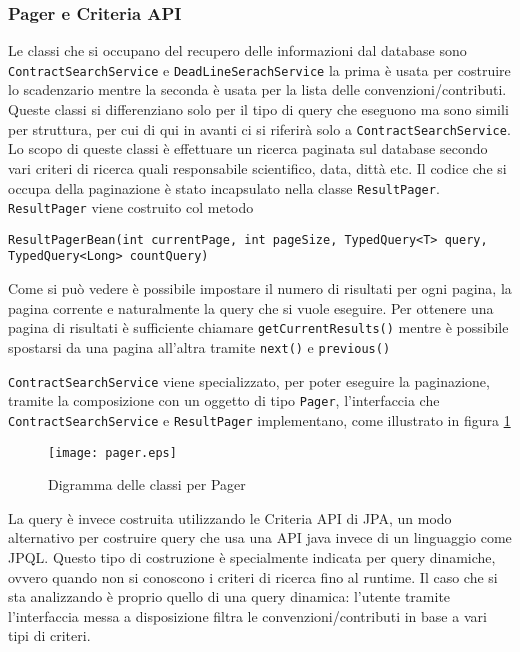 \subsubsection{Pager e Criteria API}
Le classi che si occupano del recupero delle informazioni dal database sono \texttt{ContractSearchService} e \texttt{DeadLineSerachService} la prima è usata per costruire lo scadenzario mentre la seconda è usata per la lista
delle convenzioni/contributi. Queste classi si differenziano solo per il tipo di query che eseguono ma sono simili per struttura, per cui di qui in avanti ci si riferirà solo a \texttt{ContractSearchService}. 
Lo scopo di queste classi è effettuare un ricerca paginata sul database secondo vari criteri di ricerca quali 
responsabile scientifico, data, dittà etc. Il codice che si occupa della paginazione è stato incapsulato nella classe \texttt{ResultPager}. \texttt{ResultPager} viene costruito
col metodo

\begin{lstlisting}
ResultPagerBean(int currentPage, int pageSize, TypedQuery<T> query, TypedQuery<Long> countQuery)
\end{lstlisting}


Come si può vedere è possibile impostare il numero di risultati per ogni pagina, la pagina corrente e naturalmente la query che si vuole eseguire. Per ottenere una pagina di risultati è sufficiente chiamare \lstinline{getCurrentResults()}
mentre è possibile spostarsi da una pagina all'altra tramite \lstinline{next()} e \lstinline{previous()}

\texttt{ContractSearchService} viene specializzato, per poter eseguire la paginazione, tramite la composizione con un oggetto di tipo \texttt{Pager}, l'interfaccia che \texttt{ContractSearchService} e \texttt{ResultPager} implementano, come
illustrato in figura \ref{pager}


\begin{figure}[h]
  \caption{Digramma delle classi per Pager}
  \label{pager}
  \centering
    \texttt{[image: pager.eps]}
\end{figure}

La query è invece costruita utilizzando le Criteria API di JPA, un modo alternativo per costruire query che usa una API java invece di un linguaggio
come JPQL. Questo tipo di costruzione è specialmente indicata per query dinamiche, ovvero quando non si conoscono i criteri di ricerca fino al runtime.
Il caso che si sta analizzando è proprio quello di una query dinamica: l'utente tramite l'interfaccia messa a disposizione filtra le convenzioni/contributi
in base a vari tipi di criteri.

